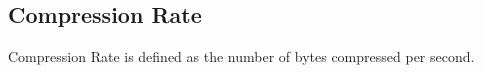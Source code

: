 \subsection{Compression Rate}

Compression Rate is defined as the number of bytes compressed per second. 

